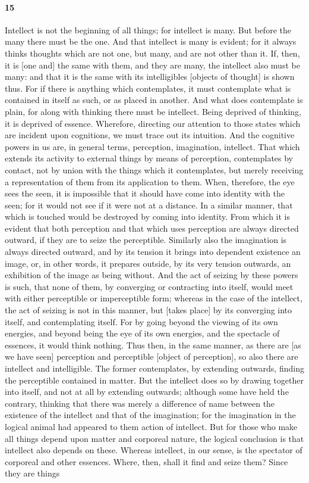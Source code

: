 \documentclass[12pt]{article}
\begin{document}
\paragraph{15} Intellect is not the beginning of all things; for intellect is many. But before the many there must be the one. And that intellect is many is evident; for it always thinks thoughts which are not one, but many, and are not other than it. If, then, it is [one and] the same with them, and they are many, the intellect also must be many: and that it is the same with its intelligibles [objects of thought] is shown thus. For if there is anything which contemplates, it must contemplate what is contained in itself as such, or as placed in another. And what does contemplate is plain, for along with thinking there must be intellect. Being deprived of thinking, it is deprived of essence. Wherefore, directing our attention to those states which are incident upon cognitions, we must trace out its intuition. And the cognitive powers in us are, in general terms, perception, imagination, intellect. That which extends its activity to external things by means of perception, contemplates by contact, not by union with the things which it contemplates, but merely receiving a representation of them from its application to them. When, therefore, the eye sees the seen, it is impossible that it should have come into identity with the seen; for it would not see if it were not at a distance. In a similar manner, that which is touched would be destroyed by coming into identity. From which it is evident that both perception and that which uses perception are always directed outward, if they are to seize the perceptible. Similarly also the imagination is always directed outward, and by its tension it brings into dependent existence an image, or, in other words, it prepares outside, by its very tension outwards, an exhibition of the image as being without. And the act of seizing by these powers is such, that none of them, by converging or contracting into itself, would meet with either perceptible or imperceptible form; whereas in the case of the intellect, the act of seizing is not in this manner, but [takes place] by its converging into itself, and contemplating itself. For by going beyond the viewing of its own energies, and beyond being the eye of its own energies, and the spectacle of essences, it would think nothing. Thus then, in the same manner, as there are [as we have seen] perception and perceptible [object of perception], so also there are intellect and intelligible. The former contemplates, by extending outwards, finding the perceptible contained in matter. But the intellect does so by drawing together into itself, and not at all by extending outwards; although some have held the contrary, thinking that there was merely a difference of name between the existence of the intellect and that of the imagination; for the imagination in the logical animal had appeared to them action of intellect. But for those who make all things depend upon matter and corporeal nature, the logical conclusion is that intellect also depends on these. Whereas intellect, in our sense, is the spectator of corporeal and other essences. Where, then, shall it find and seize them? Since they are things 
\end{document}
